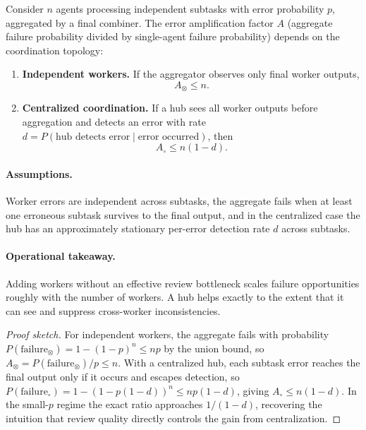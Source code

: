 \begin{theorem}
\label{thm:error-amplification}
Consider $n$ agents processing independent subtasks with error probability $p$, aggregated by a final
combiner. The error amplification factor $A$ (aggregate failure probability divided by single-agent
failure probability) depends on the coordination topology:
\begin{enumerate}[leftmargin=*]
\item[(a)] \textbf{Independent workers.} If the aggregator observes only final worker outputs,
\begin{equation}
A_{\otimes} \le n.
\label{eq:error-amp-independent}
\end{equation}
\item[(b)] \textbf{Centralized coordination.} If a hub sees all worker outputs before aggregation and detects
an error with rate $d = P(\text{hub detects error} \mid \text{error occurred})$, then
\begin{equation}
A_{\circ} \le n(1-d).
\label{eq:error-amp-centralized}
\end{equation}
\end{enumerate}
\end{theorem}

\paragraph{Assumptions.}
Worker errors are independent across subtasks, the aggregate fails when at least one erroneous subtask
survives to the final output, and in the centralized case the hub has an approximately stationary
per-error detection rate $d$ across subtasks.

\paragraph{Operational takeaway.}
Adding workers without an effective review bottleneck scales failure opportunities roughly with the number
of workers. A hub helps exactly to the extent that it can see and suppress cross-worker inconsistencies.

\begin{proof}[Proof sketch]
For independent workers, the aggregate fails with probability
$P(\mathrm{failure}_{\otimes}) = 1 - (1-p)^n \le np$ by the union bound, so
$A_{\otimes} = P(\mathrm{failure}_{\otimes})/p \le n$. With a centralized hub, each subtask error reaches
the final output only if it occurs and escapes detection, so
$P(\mathrm{failure}_{\circ}) = 1 - (1-p(1-d))^n \le np(1-d)$, giving
$A_{\circ} \le n(1-d)$. In the small-$p$ regime the exact ratio approaches $1/(1-d)$, recovering the
intuition that review quality directly controls the gain from centralization.
\end{proof}

